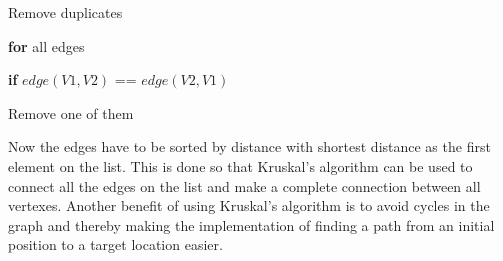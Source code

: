 \documentclass[../Head/Main.tex]{subfiles}
\begin{document}
\begin{Pseudo}{Remove duplicates}{}

 	\textbf{for} all edges 
 	
 	 \textbf{if} $edge(V1,V2)$ == $edge(V2,V1)$  
 	 	
	 Remove one of them

\end{Pseudo} 
 
Now the edges have to be sorted by distance with shortest distance as the first element on the list. This is done so that Kruskal's algorithm can be used to connect all the edges on the list and make a complete connection between all vertexes. Another benefit of using Kruskal's algorithm is to avoid cycles in the graph and thereby making the implementation of finding a path from an initial position to a target location easier.      
\end{document}
